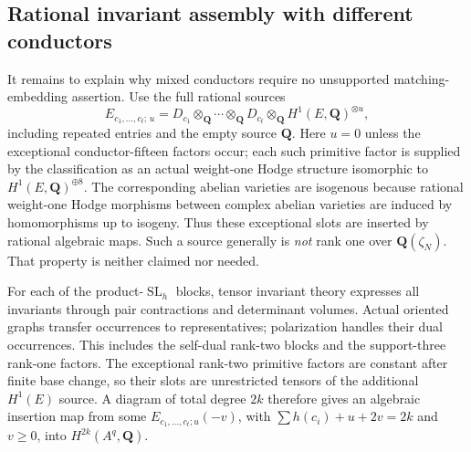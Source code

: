 \documentclass[11pt]{article}
\theoremstyle{definition}
\newcommand{\Q}{\mathbf Q}
\newcommand{\SL}{\operatorname{SL}}
\begin{document}
\subsection{Rational invariant assembly with different conductors}
It remains to explain why mixed conductors require no unsupported
matching-embedding assertion. Use the full rational sources
\[
 E_{c_1,\ldots,c_t;\,u}=
 D_{c_1}\otimes_\Q\cdots\otimes_\Q D_{c_t}
                  \otimes_\Q H^1(E,\Q)^{\otimes u},
\]
including repeated entries and the empty source $\Q$. Here $u=0$
unless the exceptional conductor-fifteen factors occur; each such
primitive factor is supplied by the classification as an actual
weight-one Hodge structure isomorphic to $H^1(E,\Q)^{\oplus8}$.
The corresponding abelian varieties are isogenous because rational
weight-one Hodge morphisms between complex abelian varieties are
induced by homomorphisms up to isogeny. Thus these exceptional slots
are inserted by rational algebraic maps.
Such a source generally is \emph{not} rank one over $\Q(\zeta_N)$.
That property is neither claimed nor needed.

For each of the product-$\SL_h$ blocks, tensor invariant theory expresses
all invariants through pair contractions and determinant volumes.
Actual oriented graphs transfer occurrences to representatives;
polarization handles their dual occurrences. This includes the
self-dual rank-two blocks and the support-three rank-one factors.
The exceptional rank-two primitive factors are constant after finite
base change, so their slots are unrestricted tensors of the additional
$H^1(E)$ source. A diagram of total degree $2k$ therefore gives an
algebraic insertion map from some $E_{c_1,\ldots,c_t;u}(-v)$, with
$\sum h(c_i)+u+2v=2k$ and $v\geq0$, into $H^{2k}(A^q,\Q)$.
\end{document}
